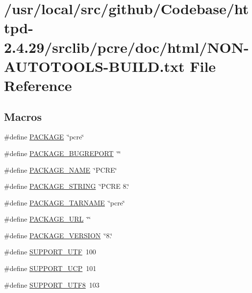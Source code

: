 \hypertarget{NON-AUTOTOOLS-BUILD_8txt}{}\section{/usr/local/src/github/\+Codebase/httpd-\/2.4.29/srclib/pcre/doc/html/\+N\+O\+N-\/\+A\+U\+T\+O\+T\+O\+O\+L\+S-\/\+B\+U\+I\+LD.txt File Reference}
\label{NON-AUTOTOOLS-BUILD_8txt}
\subsection*{Macros}
\begin{DoxyCompactItemize}
\item 
\#define \hyperlink{NON-AUTOTOOLS-BUILD_8txt_aca8570fb706c81df371b7f9bc454ae03}{P\+A\+C\+K\+A\+GE}~\char`\"{}pcre\char`\"{}
\item 
\#define \hyperlink{NON-AUTOTOOLS-BUILD_8txt_a1d1d2d7f8d2f95b376954d649ab03233}{P\+A\+C\+K\+A\+G\+E\+\_\+\+B\+U\+G\+R\+E\+P\+O\+RT}~\char`\"{}\char`\"{}
\item 
\#define \hyperlink{NON-AUTOTOOLS-BUILD_8txt_a1c0439e4355794c09b64274849eb0279}{P\+A\+C\+K\+A\+G\+E\+\_\+\+N\+A\+ME}~\char`\"{}P\+C\+RE\char`\"{}
\item 
\#define \hyperlink{NON-AUTOTOOLS-BUILD_8txt_ac73e6f903c16eca7710f92e36e1c6fbf}{P\+A\+C\+K\+A\+G\+E\+\_\+\+S\+T\+R\+I\+NG}~\char`\"{}P\+C\+RE 8.\char`\"{}
\item 
\#define \hyperlink{NON-AUTOTOOLS-BUILD_8txt_af415af6bfede0e8d5453708afe68651c}{P\+A\+C\+K\+A\+G\+E\+\_\+\+T\+A\+R\+N\+A\+ME}~\char`\"{}pcre\char`\"{}
\item 
\#define \hyperlink{NON-AUTOTOOLS-BUILD_8txt_a5c93853116d5a50307b6744f147840aa}{P\+A\+C\+K\+A\+G\+E\+\_\+\+U\+RL}~\char`\"{}\char`\"{}
\item 
\#define \hyperlink{NON-AUTOTOOLS-BUILD_8txt_aa326a05d5e30f9e9a4bb0b4469d5d0c0}{P\+A\+C\+K\+A\+G\+E\+\_\+\+V\+E\+R\+S\+I\+ON}~\char`\"{}8.\char`\"{}
\item 
\#define \hyperlink{NON-AUTOTOOLS-BUILD_8txt_ac9cf172c19c6be2292d6ef92c2230689}{S\+U\+P\+P\+O\+R\+T\+\_\+\+U\+TF}~100
\item 
\#define \hyperlink{NON-AUTOTOOLS-BUILD_8txt_a6c8853901b8b986790957eddd78580f5}{S\+U\+P\+P\+O\+R\+T\+\_\+\+U\+CP}~101
\item 
\#define \hyperlink{NON-AUTOTOOLS-BUILD_8txt_a6413a9723e5adba3279597ef388625e5}{S\+U\+P\+P\+O\+R\+T\+\_\+\+U\+T\+F8}~103
\end{DoxyCompactItemize}
